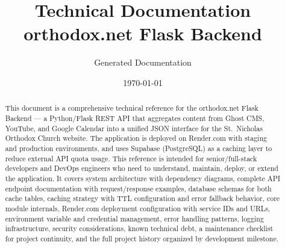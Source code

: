 \documentclass[12pt]{article}
\title{Technical Documentation\\[0.3em]
\large orthodox.net Flask Backend}
\author{Generated Documentation}
\date{\today}
\begin{document}
\sloppy

\maketitle

\begin{abstract}
This document is a comprehensive technical reference for the orthodox.net Flask Backend --- a Python/Flask REST API that aggregates content from Ghost CMS, YouTube, and Google Calendar into a unified JSON interface for the St.\ Nicholas Orthodox Church website. The application is deployed on Render.com with staging and production environments, and uses Supabase (PostgreSQL) as a caching layer to reduce external API quota usage. This reference is intended for senior/full-stack developers and DevOps engineers who need to understand, maintain, deploy, or extend the application. It covers system architecture with dependency diagrams, complete API endpoint documentation with request/response examples, database schemas for both cache tables, caching strategy with TTL configuration and error fallback behavior, core module internals, Render.com deployment configuration with service IDs and URLs, environment variable and credential management, error handling patterns, logging infrastructure, security considerations, known technical debt, a maintenance checklist for project continuity, and the full project history organized by development milestone.
\end{abstract}

\tableofcontents
\newpage

\end{document}
